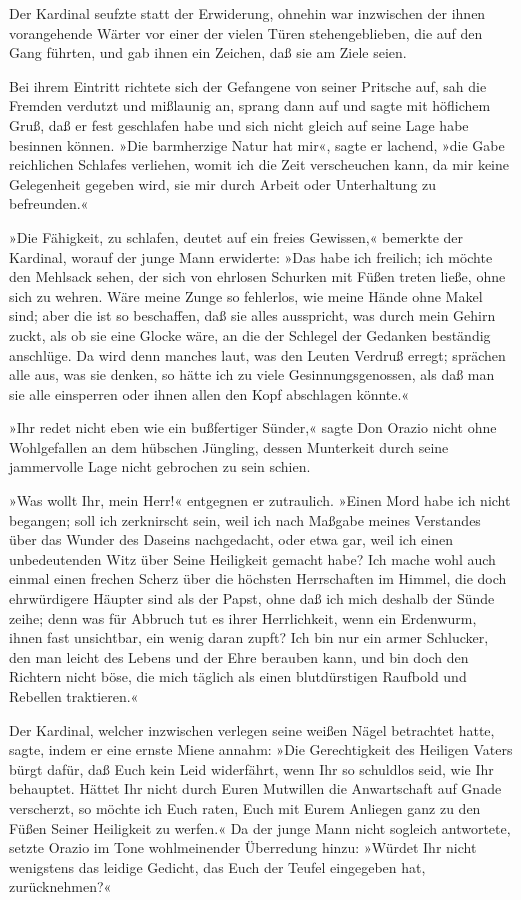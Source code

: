 Der Kardinal seufzte statt der Erwiderung, ohnehin war inzwischen
der ihnen vorangehende Wärter vor einer der vielen Türen
stehengeblieben, die auf den Gang führten, und gab ihnen ein
Zeichen, daß sie am Ziele seien.

Bei ihrem Eintritt richtete sich der Gefangene von seiner Pritsche
auf, sah die Fremden verdutzt und mißlaunig an, sprang dann auf und
sagte mit höflichem Gruß, daß er fest geschlafen habe und sich
nicht gleich auf seine Lage habe besinnen können. »Die barmherzige
Natur hat mir«, sagte er lachend, »die Gabe reichlichen Schlafes
verliehen, womit ich die Zeit verscheuchen kann, da mir keine
Gelegenheit gegeben wird, sie mir durch Arbeit oder Unterhaltung zu
befreunden.«

»Die Fähigkeit, zu schlafen, deutet auf ein freies Gewissen,«
bemerkte der Kardinal, worauf der junge Mann erwiderte: »Das habe
ich freilich; ich möchte den Mehlsack sehen, der sich von ehrlosen
Schurken mit Füßen treten ließe, ohne sich zu wehren. Wäre meine
Zunge so fehlerlos, wie meine Hände ohne Makel sind; aber die ist
so beschaffen, daß sie alles ausspricht, was durch mein Gehirn
zuckt, als ob sie eine Glocke wäre, an die der Schlegel der
Gedanken beständig anschlüge. Da wird denn manches laut, was den
Leuten Verdruß erregt; sprächen alle aus, was sie denken, so hätte
ich zu viele Gesinnungsgenossen, als daß man sie alle einsperren
oder ihnen allen den Kopf abschlagen könnte.«

»Ihr redet nicht eben wie ein bußfertiger Sünder,« sagte Don Orazio
nicht ohne Wohlgefallen an dem hübschen\pagenum{[59]} Jüngling,
dessen Munterkeit durch seine jammervolle Lage nicht gebrochen zu
sein schien.

»Was wollt Ihr, mein Herr!« entgegnen er zutraulich. »Einen Mord
habe ich nicht begangen; soll ich zerknirscht sein, weil ich nach
Maßgabe meines Verstandes über das Wunder des Daseins nachgedacht,
oder etwa gar, weil ich einen unbedeutenden Witz über Seine
Heiligkeit gemacht habe? Ich mache wohl auch einmal einen frechen
Scherz über die höchsten Herrschaften im Himmel, die doch
ehrwürdigere Häupter sind als der Papst, ohne daß ich mich deshalb
der Sünde zeihe; denn was für Abbruch tut es ihrer Herrlichkeit,
wenn ein Erdenwurm, ihnen fast unsichtbar, ein wenig daran zupft?
Ich bin nur ein armer Schlucker, den man leicht des Lebens und der
Ehre berauben kann, und bin doch den Richtern nicht böse, die mich
täglich als einen blutdürstigen Raufbold und Rebellen traktieren.«

Der Kardinal, welcher inzwischen verlegen seine weißen Nägel
betrachtet hatte, sagte, indem er eine ernste Miene annahm: »Die
Gerechtigkeit des Heiligen Vaters bürgt dafür, daß Euch kein Leid
widerfährt, wenn Ihr so schuldlos seid, wie Ihr behauptet. Hättet
Ihr nicht durch Euren Mutwillen die Anwartschaft auf Gnade
verscherzt, so möchte ich Euch raten, Euch mit Eurem Anliegen ganz
zu den Füßen Seiner Heiligkeit zu werfen.« Da der junge Mann nicht
sogleich antwortete, setzte Orazio im Tone wohlmeinender Überredung
hinzu: »Würdet Ihr nicht wenigstens das leidige Gedicht, das Euch
der Teufel eingegeben hat, zurücknehmen?«

